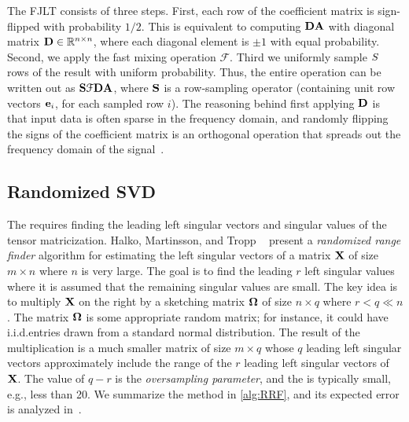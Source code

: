 The FJLT consists of three steps. First, each row of the coefficient
matrix is sign-flipped with probability $1/2$. This is equivalent to
computing $\M{D}\M{A}$ with diagonal matrix $\M{D}\in
\mathbb{R}^{n\times n}$, where each diagonal element is $\pm 1$ with
equal probability. Second, we apply the fast mixing operation
$\mathcal{F}$. Third we uniformly sample $S$ rows of the
result with uniform probability. Thus, the entire operation can be
written out as $\M{S}\mathcal{F}\M{D}\M{A}$, where $\M{S}$ is a row-sampling operator (containing unit row vectors $\V{e}_{i}$, for each sampled row $i$).
The reasoning behind first
applying $\M{D}$ is that input data is often sparse in the frequency
domain, and randomly flipping the signs of the coefficient matrix is an
orthogonal operation that spreads out the frequency domain of
the signal~\cite{fjlt}. 
%
\subsection{Randomized SVD}
The \MTFSBC requires finding the leading left singular vectors and singular values of the tensor 
matricization. Halko, Martinsson, and Tropp ~\cite[Alg.~4.1]{halko} present a \emph{randomized range finder} algorithm 
for estimating the left singular vectors of a matrix $\M{X}$ of size $m \times n$ where $n$ is very large.
The goal is to find the leading $r$ left singular values where it is assumed that the remaining singular values are small.
The key idea is to multiply $\M{X}$ on the right
by a sketching matrix $\M{\Omega}$ of size $n \times q$ where $r < q \ll n$.
The matrix $\M{\Omega}$ is some appropriate random matrix;
for instance, it could have i.i.d.\@ entries drawn from a standard normal distribution.
The result of the multiplication is a much smaller matrix of size $m \times q$ whose $q$ leading left singular vectors approximately include the range of the $r$ leading left singular vectors of $\M{X}$.
The value of $q-r$ is the \emph{oversampling parameter}, and the is typically small, e.g., less than 20.
We summarize the method in \cref{alg:RRF}, and its expected error is analyzed in~\cite{halko}.

